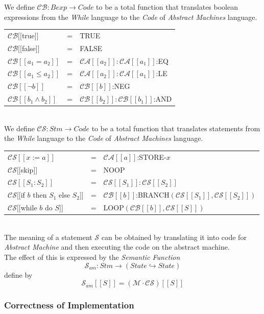 \documentclass[11pt,a4paper]{article}
\begin{document}
We define $\mathcal{CB}:Bexp\to Code$ to be a total function that translates boolean expressions from the \textit{While} language to the \textit{Code} of \textit{Abstract Machines} language.\\
\begin{tabular}{lcl}
$\mathcal{CB}[[$true$]]$&=&TRUE\\
$\mathcal{CB}[[$false$]]$&=&FALSE\\
$\mathcal{CB}[[a_1=a_2]]$&=&$\mathcal{CA}[[a_2]]:\mathcal{CA}[[a_1]]$:EQ\\
$\mathcal{CB}[[a_1\leq a_2]]$&=&$\mathcal{CA}[[a_2]]:\mathcal{CA}[[a_1]]$:LE\\
$\mathcal{CB}[[\neg b]]$&=&$\mathcal{CB}[[b]]$:NEG\\
$\mathcal{CB}[[b_1\wedge b_2]]$&=&$\mathcal{CB}[[b_2]]:\mathcal{CB}[[b_1]]$:AND\\
\end{tabular}
\\

We define $\mathcal{CS}:Stm\to Code$ to be a total function that translates statements from the \textit{While} language to the \textit{Code} of \textit{Abstract Machines} language.\\
\begin{tabular}{lcl}
$\mathcal{CS}[[x:=a]]$&=&$\mathcal{CA}[[a]]$:STORE-$x$\\
$\mathcal{CS}[[$skip$]]$&=&NOOP\\
$\mathcal{CS}[[S_1:S_2]]$&=&$\mathcal{CS}[[S_1]]:\mathcal{CS}[[S_2]]$\\
$\mathcal{CS}[[$if $b$ then $S_1$ else $S_2]]$&=&$\mathcal{CB}[[b]]$:BRANCH$(\mathcal{CS}[[S_1]],\mathcal{CS}[[S_2]])$\\
$\mathcal{CS}[[$while $b$ do $S]]$&=&LOOP$(\mathcal{CB}[[b]],\mathcal{CS}[[S]])$
\end{tabular}
\\

The meaning of a statement $\mathcal{S}$ can be obtained by translating it into code for \textit{Abstract Machine} and then executing the code on the abstract machine.\\
The effect of this is expressed by the \textit{Semantic Function}
$$\mathcal{S}_{am}:Stm\to(State\hookrightarrow State)$$
define by
$$\mathcal{S}_{am}[[S]]=(\mathcal{M}\cdot\mathcal{CS})[[S]]$$

\subsubsection{Correctness of Implementation}
\end{document}
